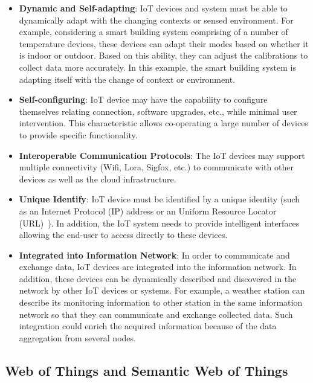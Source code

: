 \begin{itemize}
    \item \textbf{Dynamic and Self-adapting}: IoT devices and system must be able to dynamically adapt with the changing contexts or sensed environment. For example, considering a smart building system comprising of a number of temperature devices, these devices can adapt their modes based on whether it is indoor or outdoor. Based on this ability, they can adjust the calibrations to collect data more accurately. In this example, the smart building system is adapting itself with the change of context or environment.
    
    \item \textbf{Self-configuring}: IoT device may have the capability to configure themselves relating connection, software upgrades, etc., while minimal user intervention.  This characteristic allows co-operating a large number of devices to provide specific functionality.
    
    \item \textbf{Interoperable Communication Protocols}: The IoT devices may support multiple connectivity (Wifi, Lora, Sigfox, etc.) to communicate with other devices as well as the cloud infrastructure.
    
    \item \textbf{Unique Identify}: IoT device must be identified by a unique identity (such as an Internet Protocol (IP) address or an Uniform Resource Locator (URL)~). In addition, the IoT system needs to provide intelligent interfaces allowing the end-user to access directly to these devices.
    
    \item \textbf{Integrated into Information Network}: In order to communicate and exchange data, IoT devices are integrated into the information network. In addition, these devices can be dynamically described and discovered in the network by other IoT devices or systems. For example, a weather station can describe its monitoring information to other station in the same information network so that they can communicate and exchange collected data. Such integration could enrich the acquired information because of the data aggregation from several nodes.
    
\end{itemize}

\subsection{Web of Things and Semantic Web of Things}

